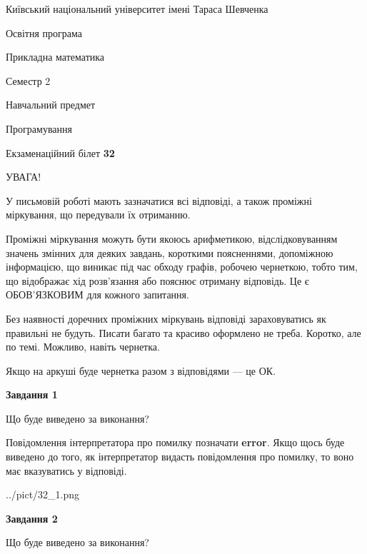 \documentclass[12pt, ukrainian]{article}
\begin{document}
{{\begin {small}\par
{ \center  Київський національний університет імені Тараса Шевченка \par}
{\parbox {5 cm}{Освітня програма \hfill}{\parbox {7 cm}{Прикладна математика \hfill}}\parbox {6 cm}{\hfill Семестр 2}}\par
{\parbox {5 cm} {Навчальний предмет \hfill}\parbox {7 cm}{Програмування \hfill}\parbox {6cm}{\hfill}\par}\vspace{-7pt} \end{small}}{\center Екзаменаційний білет \No \textbf
{ 32 }\par}}
{
\begin {large}
УВАГА!

У письмовій роботі мають зазначатися всі відповіді, а також проміжні міркування, що передували їх отриманню.

Проміжні міркування можуть бути якоюсь арифметикою, відслідковуванням зна\-чень змінних для деяких завдань,
короткими поясненнями, допоміжною інформацією, що виникає під час обходу графів, робочею чернеткою,
тобто тим, що відображає хід розв’язання або пояснює отриману відповідь.
Це є ОБОВ’ЯЗКОВИМ для кожного запитання.

Без наявності доречних проміжних міркувань відповіді зараховуватись як правиль\-ні не будуть.
Писати багато та красиво оформлено не треба. Коротко, але по темі. Можли\-во, навіть чернетка.

Якщо на аркуші буде чернетка разом з відповідями --- це ОК.

\newpage

{\begin {center}\textbf{Завдання 1}\end {center}}\par
Що буде виведено за виконання?

Повідомлення інтерпретатора про помилку позначати \textbf{error}.
Якщо щось буде виведено до того, як інтерпретатор видасть повідомлення про помилку, 
то воно має вказуватись у відповіді. \par


\begin{center}
	{../pict/32_1.png}
\end{center}
\newpage

{\begin {center}\textbf{Завдання 2}\end {center}}\par
Що буде виведено за виконання?


\end{large}}
\end{document}
